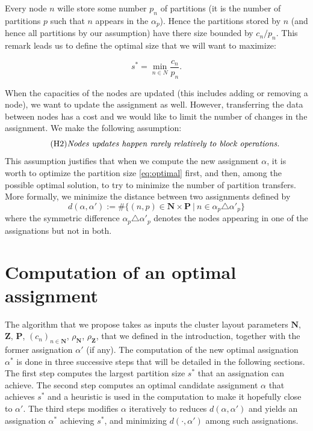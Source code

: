 \documentclass[]{article}
\begin{document}
Every node $n$ wille store some number $p_n$ of partitions (it is the number of partitions $p$ such that $n$ appears in the $\alpha_p$). Hence the partitions stored by $n$ (and hence all partitions by our assumption) have there size bounded by $c_n/p_n$. This remark leads us to define the optimal size that we will want to maximize:

\begin{equation}
	\label{eq:optimal}
	\tag{OPT}
s^* = \min_{n \in N} \frac{c_n}{p_n}.
\end{equation}

When the capacities of the nodes are updated (this includes adding or removing a node), we want to update the assignment as well. However, transferring the data between nodes has a cost and we would like to limit the number of changes in the assignment. We make the following assumption:
\begin{equation}
	\tag{H2}
	\text{\emph{Nodes updates happen rarely relatively to block operations.}}
\end{equation}
This assumption justifies that when we compute the new assignment $\alpha$, it is worth to optimize the partition size \eqref{eq:optimal} first, and then, among the possible optimal solution, to try to minimize the number of partition transfers. More formally, we minimize the distance between two assignments defined by
\begin{equation}
	d(\alpha, \alpha') := \#\{ (n,p) \in \mathbf{N}\times\mathbf{P} ~|~ n\in \alpha_p \triangle \alpha'_p \}
\end{equation}
where the symmetric difference $\alpha_p \triangle \alpha'_p$ denotes the nodes appearing in one of the assignations but not in both.

\section{Computation of an optimal assignment}

The algorithm that we propose takes as inputs the cluster layout parameters $\mathbf{N}$, $\mathbf{Z}$, $\mathbf{P}$, $(c_n)_{n\in \mathbf{N}}$, $\rho_\mathbf{N}$, $\rho_\mathbf{Z}$, that we defined in the introduction, together with the former assignation $\alpha'$ (if any). The computation of the new optimal assignation $\alpha^*$ is done in three successive steps that will be detailed in the following sections. The first step computes the largest partition size $s^*$ that an assignation can achieve. The second step computes an optimal candidate assignment $\alpha$ that achieves $s^*$ and a heuristic is used in the computation to make it hopefully close to $\alpha'$. The third steps modifies $\alpha$ iteratively to reduces $d(\alpha, \alpha')$ and yields an assignation $\alpha^*$ achieving $s^*$, and minimizing $d(\cdot, \alpha')$ among such assignations.
\end{document}
